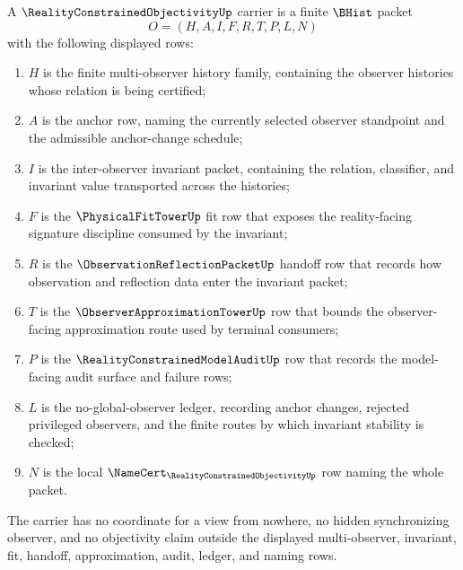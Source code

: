 \begin{definition}
\label{def:reality-constrained-objectivity-carrier}
A $\RealityConstrainedObjectivityUp$ carrier is a finite $\BHist$ packet
$$
O=(H,A,I,F,R,T,P,L,N)
$$
with the following displayed rows:
\begin{enumerate}
\item $H$ is the finite multi-observer history family, containing the observer histories whose relation is being certified;
\item $A$ is the anchor row, naming the currently selected observer standpoint and the admissible anchor-change schedule;
\item $I$ is the inter-observer invariant packet, containing the relation, classifier, and invariant value transported across the histories;
\item $F$ is the $\PhysicalFitTowerUp$ fit row that exposes the reality-facing signature discipline consumed by the invariant;
\item $R$ is the $\ObservationReflectionPacketUp$ handoff row that records how observation and reflection data enter the invariant packet;
\item $T$ is the $\ObserverApproximationTowerUp$ row that bounds the observer-facing approximation route used by terminal consumers;
\item $P$ is the $\RealityConstrainedModelAuditUp$ row that records the model-facing audit surface and failure rows;
\item $L$ is the no-global-observer ledger, recording anchor changes, rejected privileged observers, and the finite routes by which invariant stability is checked;
\item $N$ is the local $\NameCert_{\RealityConstrainedObjectivityUp}$ row naming the whole packet.
\end{enumerate}
The carrier has no coordinate for a view from nowhere, no hidden synchronizing observer, and no objectivity claim outside the displayed multi-observer, invariant, fit, handoff, approximation, audit, ledger, and naming rows.
\end{definition}

